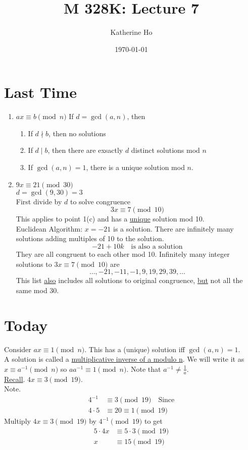 \documentclass[letterpaper]{article}
\title{M 328K: Lecture 7}
\author{Katherine Ho}
\date\today
\begin{document}
\maketitle

\section{Last Time}
\begin{enumerate}
    \item $ax\equiv b \pmod{n}$
        If $d=\gcd(a,n)$, then 
        \begin{enumerate}
            \item If $d\nmid b$, then no solutions
            \item If $d\mid b$, then there are exsactly $d$ distinct solutions mod $n$
            \item If $\gcd(a,n)=1$, there is a unique solution mod $n$.
        \end{enumerate}
    \item $9x\equiv 21 \pmod{30}$ \\
        $d=\gcd(9,30)=3$ \\
        First divide by $d$ to solve congruence
        \[ 3x\equiv 7\pmod{10} \] 
        This applies to point 1(c) and has a \underline{unique} solution mod 10. \\
        Euclidean Algorithm: $x=-21$ is a solution.  There are infinitely many solutions
        adding multiples of 10 to the solution.
        \[ -21+10k \quad\text{is also a solution} \]
        They are all congruent to each other mod 10.
        Infinitely many integer solutions to $3x\equiv 7\pmod{10}$ are
        \[ \dots,-21,-11,-1,9,19,29,39,\dots \]
        This list \underline{also} includes all solutions to original congruence, 
        \underline{but} not all the same mod 30.
\end{enumerate}
    
\section{Today}
    Consider $ax\equiv 1\pmod{n}$. This has a (unique) solution iff 
    $\gcd(a,n)=1$. \\
    A solution is called a \underline{multiplicative inverse of
    a modulo n}. We will write it as $x\equiv a^{-1}\pmod{n}$ so $aa^{-1}\equiv 1\pmod{n}$.
    Note that $a^{-1}\ne \frac{1}{a}$. \\
    \underline{Recall}. $4x\equiv 3\pmod{19}$. \\
    Note. 
    \begin{align*}
        4^{-1} &\equiv 3\pmod{19} \quad\text{Since} \\
        4\cdot 5 &\equiv 20\equiv 1\pmod{19}
    \end{align*}
    Multiply $4x\equiv 3\pmod{19}$ by $4^{-1}\pmod{19}$ to get 
    \begin{align*}
        5\cdot 4x &\equiv 5\cdot 3\pmod{19} \\
        x &\equiv 15 \pmod{19}
    \end{align*} 
\end{document}
